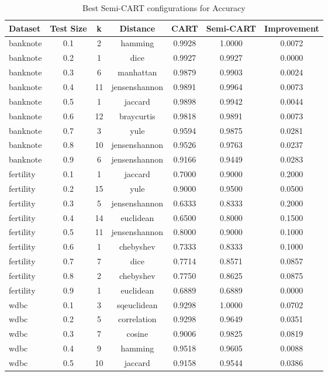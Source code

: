 \begin{table}[ht]
\centering
\caption{Best Semi-CART configurations for Accuracy}
\begin{tabular}{lcccccc}
\hline
Dataset & Test Size & k & Distance & CART & Semi-CART & Improvement \\ \hline
banknote & 0.1 & 2 & hamming & 0.9928 & 1.0000 & 0.0072 \\
banknote & 0.2 & 1 & dice & 0.9927 & 0.9927 & 0.0000 \\
banknote & 0.3 & 6 & manhattan & 0.9879 & 0.9903 & 0.0024 \\
banknote & 0.4 & 11 & jensenshannon & 0.9891 & 0.9964 & 0.0073 \\
banknote & 0.5 & 1 & jaccard & 0.9898 & 0.9942 & 0.0044 \\
banknote & 0.6 & 12 & braycurtis & 0.9818 & 0.9891 & 0.0073 \\
banknote & 0.7 & 3 & yule & 0.9594 & 0.9875 & 0.0281 \\
banknote & 0.8 & 10 & jensenshannon & 0.9526 & 0.9763 & 0.0237 \\
banknote & 0.9 & 6 & jensenshannon & 0.9166 & 0.9449 & 0.0283 \\
fertility & 0.1 & 1 & jaccard & 0.7000 & 0.9000 & 0.2000 \\
fertility & 0.2 & 15 & yule & 0.9000 & 0.9500 & 0.0500 \\
fertility & 0.3 & 5 & jensenshannon & 0.6333 & 0.8333 & 0.2000 \\
fertility & 0.4 & 14 & euclidean & 0.6500 & 0.8000 & 0.1500 \\
fertility & 0.5 & 11 & jensenshannon & 0.8000 & 0.9000 & 0.1000 \\
fertility & 0.6 & 1 & chebyshev & 0.7333 & 0.8333 & 0.1000 \\
fertility & 0.7 & 7 & dice & 0.7714 & 0.8571 & 0.0857 \\
fertility & 0.8 & 2 & chebyshev & 0.7750 & 0.8625 & 0.0875 \\
fertility & 0.9 & 1 & euclidean & 0.6889 & 0.6889 & 0.0000 \\
wdbc & 0.1 & 3 & sqeuclidean & 0.9298 & 1.0000 & 0.0702 \\
wdbc & 0.2 & 5 & correlation & 0.9298 & 0.9649 & 0.0351 \\
wdbc & 0.3 & 7 & cosine & 0.9006 & 0.9825 & 0.0819 \\
wdbc & 0.4 & 9 & hamming & 0.9518 & 0.9605 & 0.0088 \\
wdbc & 0.5 & 10 & jaccard & 0.9158 & 0.9544 & 0.0386 \\

\end{tabular}
\end{table}
